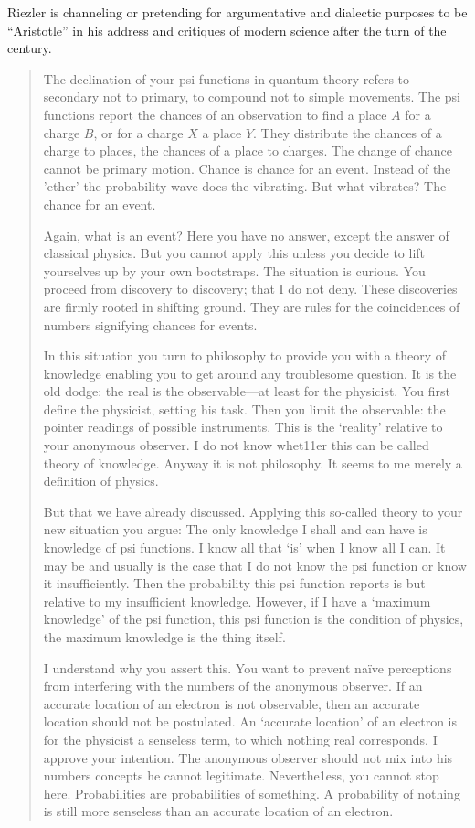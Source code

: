 Riezler is channeling or pretending for argumentative and dialectic purposes to be ``Aristotle'' in his address and critiques of modern science after the turn of the century.

\begin{quote}
     The declination of your psi functions in quantum theory refers to secondary not to primary, to compound not to simple movements. The psi functions report the chances of an observation to find a place $A$ for a charge $B$, or for a charge $X$ a place $Y$. They distribute the chances of a charge to places, the chances of a place to charges. The change of chance cannot be primary motion. Chance is chance for an event. Instead of the 'ether' the probability wave does the vibrating. But what vibrates? The chance for an event.

     Again, what is an event? Here you have no answer, except the answer of classical physics. But you cannot apply this unless you decide to lift yourselves up by your own bootstraps. The situation is curious. You proceed from discovery to discovery; that I do not deny. These discoveries are firmly rooted in shifting ground. They are rules for the coincidences of numbers signifying chances for events.

     In this situation you turn to philosophy to provide you with a theory of knowledge enabling you to get around any troublesome question. It is the old dodge: the real is the observable---at least for the physicist. You first define the physicist, setting his task. Then you limit the observable: the pointer readings of possible instruments. This is the `reality' relative to your anonymous observer. I do not know whet11er this can be called theory of knowledge. Anyway it is not philosophy. It seems to me merely a definition of physics.

    But that we have already discussed. Applying this so-called theory to your new situation you argue: The only knowledge I shall and can have is knowledge of psi functions. I know all that `is' when I know all I can. It may be and usually is the case that I do not know the psi function or know it insufficiently. Then the probability this psi function reports is but relative to my insufficient knowledge. However, if I have a `maximum knowledge' of the psi function, this psi function is the condition of physics, the maximum knowledge is the thing itself.

    I understand why you assert this. You want to prevent na\"ive perceptions from interfering with the numbers of the anonymous observer. If an accurate location of an electron is not observable, then an accurate location should not be postulated. An `accurate location' of an electron is for the physicist a senseless term, to which nothing real corresponds. I approve your intention. The anonymous observer should not mix into his numbers
    concepts he cannot legitimate. Neverthe1ess, you cannot stop here. Probabilities are probabilities of something. A probability of nothing is still more senseless than an accurate location of an electron.


\end{quote}

